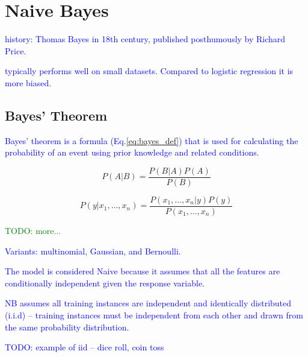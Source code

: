 \section{Naive Bayes}

\textcolor{blue}{history: Thomas Bayes in 18th century, published posthumously by Richard Price.}

\textcolor{blue}{typically performs well on small datasets. Compared to logistic regression it is more biased.}

\subsection{Bayes' Theorem}

\textcolor{blue}{Bayes' theorem is a formula (Eq.\ref{eq:bayes_def}) that is used for calculating the probability of an event using prior knowledge and related conditions.}

\begin{equation}
{P(A|B)=\frac{P(B|A)P(A)}{P(B)}}
\label{eq:bayes_def}
\end{equation}

\begin{equation}
{P(y|x_1,\dots,x_n)=\frac{P(x_1,\dots,x_n|y)P(y)}{P(x_1,\dots,x_n)}}
\label{eq:bayes_exp_def}
\end{equation}

\textcolor{green}{TODO: more...}

\textcolor{blue}{Variants: multinomial, Gaussian, and Bernoulli.}

\textcolor{blue}{The model is considered Naive because it assumes that all the features are conditionally independent given the response variable.}

\textcolor{blue}{NB assumes all training instances are {independent and identically distributed (i.i.d)} -- training instances must be independent from each other and drawn from the same probability distribution.}

\textcolor{blue}{TODO: example of iid -- dice roll, coin toss}

